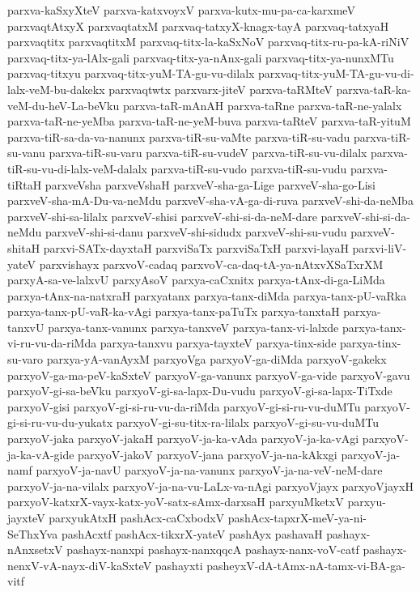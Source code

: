{parxva-kaSxyXteV
parxva-katxvoyxV
parxva-kutx-mu-pa-ca-karxmeV
parxvaqtAtxyX
parxvaqtatxM
parxvaq-tatxyX-knagx-tayA
parxvaq-tatxyaH
parxvaqtitx
parxvaqtitxM
parxvaq-titx-la-kaSxNoV
parxvaq-titx-ru-pa-kA-riNiV
parxvaq-titx-ya-lAlx-gali
parxvaq-titx-ya-nAnx-gali
parxvaq-titx-ya-nunxMTu
parxvaq-titxyu
parxvaq-titx-yuM-TA-gu-vu-dilalx
parxvaq-titx-yuM-TA-gu-vu-di-lalx-veM-bu-dakekx
parxvaqtwtx
parxvarx-jiteV
parxva-taRMteV
parxva-taR-ka-veM-du-heV-La-beVku
parxva-taR-mAnAH
parxva-taRne
parxva-taR-ne-yalalx
parxva-taR-ne-yeMba
parxva-taR-ne-yeM-buva
parxva-taRteV
parxva-taR-yituM
parxva-tiR-sa-da-va-nanunx
parxva-tiR-su-vaMte
parxva-tiR-su-vadu
parxva-tiR-su-vanu
parxva-tiR-su-varu
parxva-tiR-su-vudeV
parxva-tiR-su-vu-dilalx
parxva-tiR-su-vu-di-lalx-veM-dalalx
parxva-tiR-su-vudo
parxva-tiR-su-vudu
parxva-tiRtaH
parxveVsha
parxveVshaH
parxveV-sha-ga-Lige
parxveV-sha-go-Lisi
parxveV-sha-mA-Du-va-neMdu
parxveV-sha-vA-ga-di-ruva
parxveV-shi-da-neMba
parxveV-shi-sa-lilalx
parxveV-shisi
parxveV-shi-si-da-neM-dare
parxveV-shi-si-da-neMdu
parxveV-shi-si-danu
parxveV-shi-sidudx
parxveV-shi-su-vudu
parxveV-shitaH
parxvi-SATx-dayxtaH
parxviSaTx
parxviSaTxH
parxvi-layaH
parxvi-liV-yateV
parxvishayx
parxvoV-cadaq
parxvoV-ca-daq-tA-ya-nAtxvXSaTxrXM
parxyA-sa-ve-lalxvU
parxyAsoV
parxya-caCxnitx
parxya-tAnx-di-ga-LiMda
parxya-tAnx-na-natxraH
parxyatanx
parxya-tanx-diMda
parxya-tanx-pU-vaRka
parxya-tanx-pU-vaR-ka-vAgi
parxya-tanx-paTuTx
parxya-tanxtaH
parxya-tanxvU
parxya-tanx-vanunx
parxya-tanxveV
parxya-tanx-vi-lalxde
parxya-tanx-vi-ru-vu-da-riMda
parxya-tanxvu
parxya-tayxteV
parxya-tinx-side
parxya-tinx-su-varo
parxya-yA-vanAyxM
parxyoVga
parxyoV-ga-diMda
parxyoV-gakekx
parxyoV-ga-ma-peV-kaSxteV
parxyoV-ga-vanunx
parxyoV-ga-vide
parxyoV-gavu
parxyoV-gi-sa-beVku
parxyoV-gi-sa-lapx-Du-vudu
parxyoV-gi-sa-lapx-TiTxde
parxyoV-gisi
parxyoV-gi-si-ru-vu-da-riMda
parxyoV-gi-si-ru-vu-duMTu
parxyoV-gi-si-ru-vu-du-yukatx
parxyoV-gi-su-titx-ra-lilalx
parxyoV-gi-su-vu-duMTu
parxyoV-jaka
parxyoV-jakaH
parxyoV-ja-ka-vAda
parxyoV-ja-ka-vAgi
parxyoV-ja-ka-vA-gide
parxyoV-jakoV
parxyoV-jana
parxyoV-ja-na-kAkxgi
parxyoV-ja-namf
parxyoV-ja-navU
parxyoV-ja-na-vanunx
parxyoV-ja-na-veV-neM-dare
parxyoV-ja-na-vilalx
parxyoV-ja-na-vu-LaLx-va-nAgi
parxyoVjayx
parxyoVjayxH
parxyoV-katxrX-vayx-katx-yoV-satx-sAmx-darxsaH
parxyuMketxV
parxyu-jayxteV
parxyukAtxH
pashAcx-caCxbodxV
pashAcx-tapxrX-meV-ya-ni-SeThxYva
pashAcxtf
pashAcx-tikxrX-yateV
pashAyx
pashavaH
pashayx-nAnxsetxV
pashayx-nanxpi
pashayx-nanxqqcA
pashayx-nanx-voV-catf
pashayx-nenxV-vA-nayx-diV-kaSxteV
pashayxti
pasheyxV-dA-tAmx-nA-tamx-vi-BA-ga-vitf
}
